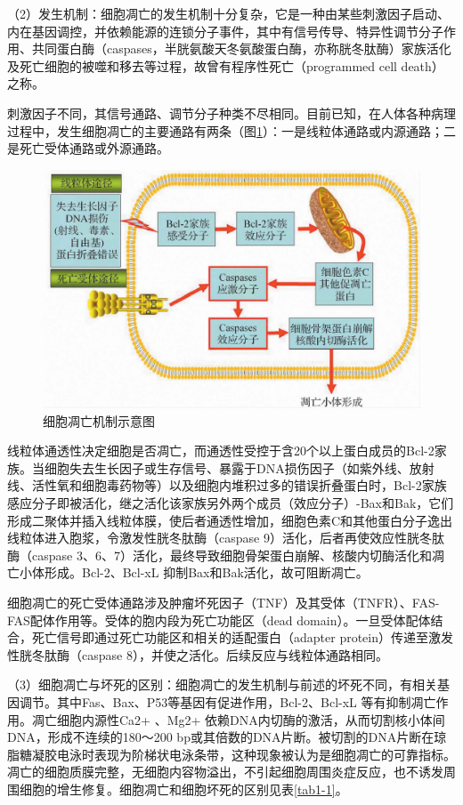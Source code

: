 （2）发生机制：细胞凋亡的发生机制十分复杂，它是一种由某些刺激因子启动、内在基因调控，并依赖能源的连锁分子事件，其中有信号传导、特异性调节分子作用、共同蛋白酶（caspases，半胱氨酸天冬氨酸蛋白酶，亦称胱冬肽酶）家族活化及死亡细胞的被噬和移去等过程，故曾有程序性死亡（programmed
cell death）之称。

刺激因子不同，其信号通路、调节分子种类不尽相同。目前已知，在人体各种病理过程中，发生细胞凋亡的主要通路有两条（图\ref{fig1-19}）：一是线粒体通路或内源通路；二是死亡受体通路或外源通路。

\begin{figure}[!htbp]
	\centering
	\includegraphics[width=.7\textwidth]{./images/Image00020.jpg}
	\caption{细胞凋亡机制示意图}
	\label{fig1-19}
\end{figure}

线粒体通透性决定细胞是否凋亡，而通透性受控于含20个以上蛋白成员的Bcl-2家族。当细胞失去生长因子或生存信号、暴露于DNA损伤因子（如紫外线、放射线、活性氧和细胞毒药物等）以及细胞内堆积过多的错误折叠蛋白时，Bcl-2家族感应分子即被活化，继之活化该家族另外两个成员（效应分子）-Bax和Bak，它们形成二聚体并插入线粒体膜，使后者通透性增加，细胞色素C和其他蛋白分子逸出线粒体进入胞浆，令激发性胱冬肽酶（caspase
9）活化，后者再使效应性胱冬肽酶（caspase
3、6、7）活化，最终导致细胞骨架蛋白崩解、核酸内切酶活化和凋亡小体形成。Bcl-2、Bcl-x{L}
抑制Bax和Bak活化，故可阻断凋亡。

细胞凋亡的死亡受体通路涉及肿瘤坏死因子（TNF）及其受体（TNFR）、FAS-FAS配体作用等。受体的胞内段为死亡功能区（dead
domain）。一旦受体配体结合，死亡信号即通过死亡功能区和相关的适配蛋白（adapter
protein）传递至激发性胱冬肽酶（caspase
8），并使之活化。后续反应与线粒体通路相同。

（3）细胞凋亡与坏死的区别：细胞凋亡的发生机制与前述的坏死不同，有相关基因调节。其中Fas、Bax、P53等基因有促进作用，Bcl-2、Bcl-x{L}
等有抑制凋亡作用。凋亡细胞内源性Ca{2+} 、Mg{2+}
依赖DNA内切酶的激活，从而切割核小体间DNA，形成不连续的180～200
bp或其倍数的DNA片断。被切割的DNA片断在琼脂糖凝胶电泳时表现为阶梯状电泳条带，这种现象被认为是细胞凋亡的可靠指标。凋亡的细胞质膜完整，无细胞内容物溢出，不引起细胞周围炎症反应，也不诱发周围细胞的增生修复。细胞凋亡和细胞坏死的区别见表\ref{tab1-1}。

